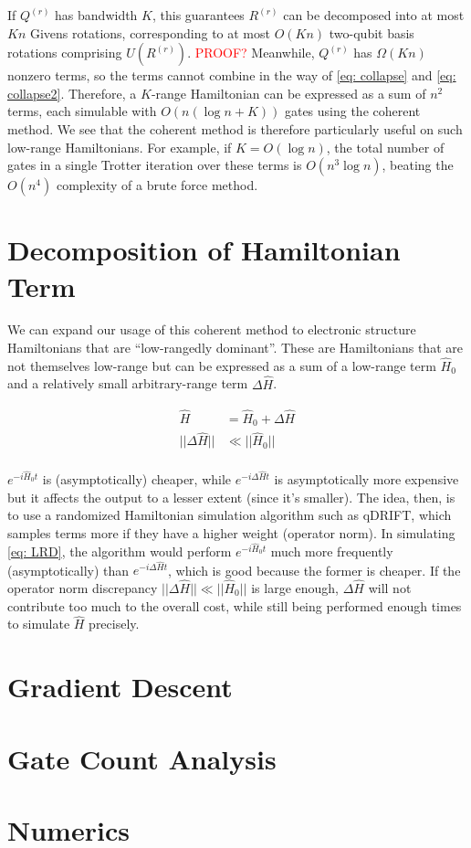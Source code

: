 If $Q^{(r)}$ has bandwidth $K$, this guarantees $R^{(r)}$ can be decomposed into at most $Kn$ Givens rotations, corresponding to at most $O(Kn)$ two-qubit basis rotations comprising $U(R^{(r)})$. \textcolor{red}{PROOF?} Meanwhile, $Q^{(r)}$ has $\Omega(Kn)$ nonzero terms, so the terms cannot combine in the way of \eqref{eq: collapse} and \eqref{eq: collapse2}. Therefore, a $K$-range Hamiltonian can be expressed as a sum of $n^2$ terms, each simulable with $O(n(\log{n} + K))$ gates using the coherent method. We see that the coherent method is therefore particularly useful on such low-range Hamiltonians. For example, if $K = O(\log{n})$, the total number of gates in a single Trotter iteration over these terms is $O(n^3\log{n})$, beating the $O(n^4)$ complexity of a brute force method.

\section{Decomposition of Hamiltonian Term}

We can expand our usage of this coherent method to electronic structure Hamiltonians that are ``low-rangedly dominant''. These are Hamiltonians that are not themselves low-range but can be expressed as a sum of a low-range term $\hat{H}_0$ and a relatively small arbitrary-range term $\Delta \hat{H}$.

\begin{equation}
    \begin{split}
        \hat{H} &= \hat{H}_0 + \Delta \hat{H} \\
        ||\Delta \hat{H}|| &\ll ||\hat{H}_0|| \\
    \end{split}
    \label{eq: LRD}
\end{equation}

$e^{-i\hat{H}_0t}$ is (asymptotically) cheaper, while $e^{-i\Delta \hat{H}t}$ is asymptotically more expensive but it affects the output to a lesser extent (since it's smaller). The idea, then, is to use a randomized Hamiltonian simulation algorithm such as qDRIFT, which samples terms more if they have a higher weight (operator norm). In simulating \eqref{eq: LRD}, the algorithm would perform $e^{-i\hat{H}_0t}$ much more frequently (asymptotically) than $e^{-i\Delta \hat{H}t}$, which is good because the former is cheaper. If the operator norm discrepancy $||\Delta \hat{H}|| \ll ||\hat{H}_0||$ is large enough, $\Delta \hat{H}$ will not contribute too much to the overall cost, while still being performed enough times to simulate $\hat{H}$ precisely.


\section{Gradient Descent}
\section{Gate Count Analysis}
\section{Numerics}



